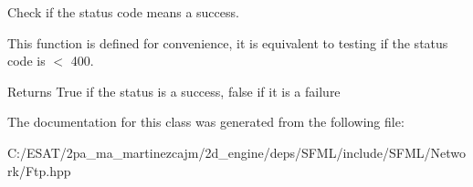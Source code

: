 Check if the status code means a success. 

This function is defined for convenience, it is equivalent to testing if the status code is $<$ 400.

\begin{DoxyReturn}{Returns}
True if the status is a success, false if it is a failure 
\end{DoxyReturn}


The documentation for this class was generated from the following file\+:\begin{DoxyCompactItemize}
\item 
C\+:/\+E\+S\+A\+T/2pa\+\_\+ma\+\_\+martinezcajm/2d\+\_\+engine/deps/\+S\+F\+M\+L/include/\+S\+F\+M\+L/\+Network/Ftp.\+hpp\end{DoxyCompactItemize}
